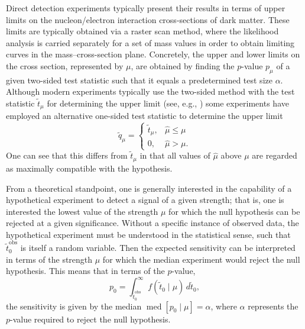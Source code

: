 \documentclass[b5paper, 10pt, twoside]{book}
\newcommand{\difd}{\,d}
\DeclareMathOperator{\med}{med}
\begin{document}
Direct detection experiments typically present their results in terms of upper limits on the nucleon/electron interaction cross-sections of dark matter. These limits are typically obtained via a raster scan method, where the likelihood analysis is carried separately for a set of mass values in order to obtain limiting curves in the mass--cross-section plane. Concretely, the upper and lower limits on the cross section, represented by $\mu$, are obtained by finding the $p$-value $p_\mu$ of a given two-sided test statistic such that it equals a predetermined test size $\alpha$. Although modern experiments typically use the two-sided method with the test statistic $\tilde{t}_\mu$ for determining the upper limit (see, e.g., \textcites{XENON2019b, PandaX2021, LZ2024}) some experiments have employed an alternative one-sided test statistic to determine the upper limit \parencite{CowanEtAl2011}
\begin{equation}
    \tilde{q}_\mu=
    \begin{cases}
        \tilde{t}_\mu,&\hat{\mu}\leq\mu\\
        0,&\hat{\mu}>\mu.
    \end{cases}
\end{equation}
One can see that this differs from $\tilde{t}_\mu$ in that all values of $\hat{\mu}$ above $\mu$ are regarded as maximally compatible with the hypothesis.

From a theoretical standpoint, one is generally interested in the capability of a hypothetical experiment to detect a signal of a given strength; that is, one is interested the lowest value of the strength $\mu$ for which the null hypothesis can be rejected at a given significance. Without a specific instance of observed data, the hypothetical experiment must be understood in the statistical sense, such that $\tilde{t}_0^\text{obs}$ is itself a random variable. Then the expected sensitivity can be interpreted in terms of the strength $\mu$ for which the median experiment would reject the null hypothesis. This means that in terms of the $p$-value,
\begin{equation}
    p_0=\int_{\tilde{t}_0^\text{obs}}^\infty f(\tilde{t}_0\mid\mu)\difd\tilde{t}_0,
\end{equation}
the sensitivity is given by the median $\med[p_0\mid\mu]=\alpha$, where $\alpha$ represents the $p$-value required to reject the null hypothesis.
\end{document}

